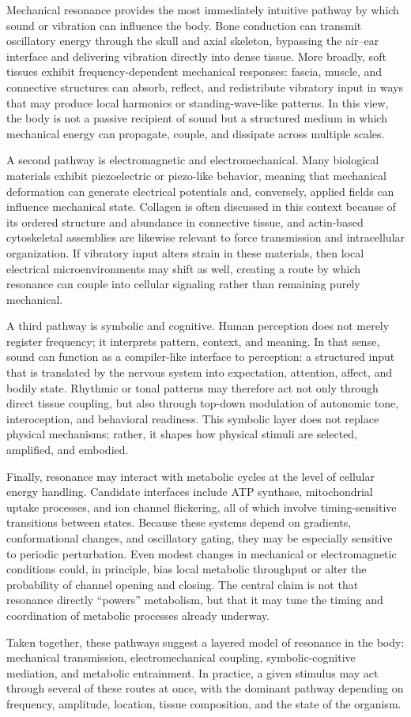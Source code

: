Mechanical resonance provides the most immediately intuitive pathway by which sound or vibration can influence the body. Bone conduction can transmit oscillatory energy through the skull and axial skeleton, bypassing the air--ear interface and delivering vibration directly into dense tissue. More broadly, soft tissues exhibit frequency-dependent mechanical responses: fascia, muscle, and connective structures can absorb, reflect, and redistribute vibratory input in ways that may produce local harmonics or standing-wave-like patterns. In this view, the body is not a passive recipient of sound but a structured medium in which mechanical energy can propagate, couple, and dissipate across multiple scales.

A second pathway is electromagnetic and electromechanical. Many biological materials exhibit piezoelectric or piezo-like behavior, meaning that mechanical deformation can generate electrical potentials and, conversely, applied fields can influence mechanical state. Collagen is often discussed in this context because of its ordered structure and abundance in connective tissue, and actin-based cytoskeletal assemblies are likewise relevant to force transmission and intracellular organization. If vibratory input alters strain in these materials, then local electrical microenvironments may shift as well, creating a route by which resonance can couple into cellular signaling rather than remaining purely mechanical.

A third pathway is symbolic and cognitive. Human perception does not merely register frequency; it interprets pattern, context, and meaning. In that sense, sound can function as a compiler-like interface to perception: a structured input that is translated by the nervous system into expectation, attention, affect, and bodily state. Rhythmic or tonal patterns may therefore act not only through direct tissue coupling, but also through top-down modulation of autonomic tone, interoception, and behavioral readiness. This symbolic layer does not replace physical mechanisms; rather, it shapes how physical stimuli are selected, amplified, and embodied.

Finally, resonance may interact with metabolic cycles at the level of cellular energy handling. Candidate interfaces include ATP synthase, mitochondrial uptake processes, and ion channel flickering, all of which involve timing-sensitive transitions between states. Because these systems depend on gradients, conformational changes, and oscillatory gating, they may be especially sensitive to periodic perturbation. Even modest changes in mechanical or electromagnetic conditions could, in principle, bias local metabolic throughput or alter the probability of channel opening and closing. The central claim is not that resonance directly ``powers'' metabolism, but that it may tune the timing and coordination of metabolic processes already underway.

Taken together, these pathways suggest a layered model of resonance in the body: mechanical transmission, electromechanical coupling, symbolic-cognitive mediation, and metabolic entrainment. In practice, a given stimulus may act through several of these routes at once, with the dominant pathway depending on frequency, amplitude, location, tissue composition, and the state of the organism.
